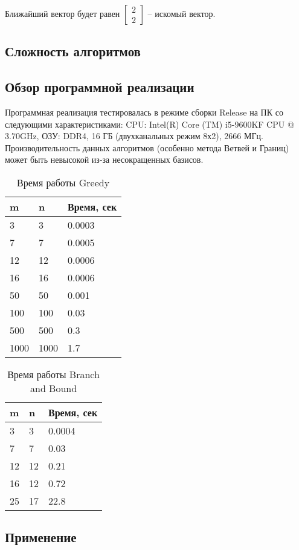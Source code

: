 Ближайший вектор будет равен $ \left[\begin{array}{cccc}
2 \\
2
\end{array}\right] $ -- искомый вектор.


\subsection{Сложность алгоритмов}

\subsection{Обзор программной реализации}

Программная реализация тестировалась в режиме сборки Release на ПК со следующими характеристиками: CPU: Intel(R) Core (TM) i5-9600KF CPU @ 3.70GHz, ОЗУ: DDR4, 16 ГБ (двухканальных режим 8х2), 2666 МГц. Производительность данных алгоритмов (особенно метода Ветвей и Границ) может быть невысокой из-за несокращенных базисов.

\begin{table}[h]
  \caption{Время работы Greedy}
  \centering
  \begin{tabular}{ | l | l | l |}
  \hline
  m & n & Время, сек   \\ \hline
  3 & 3 & 0.0003 \\ \hline
  7 & 7 & 0.0005 \\ \hline
  12 & 12 & 0.0006 \\ \hline
  16 & 16 & 0.0006 \\ \hline
  50 & 50 & 0.001 \\ \hline
  100 & 100 & 0.03 \\ \hline
  500 & 500 & 0.3 \\ \hline
  1000 & 1000 & 1.7 \\ \hline
  \end{tabular}
  \label{table:Greedy}
\end{table}

\begin{table}[h]
  \caption{Время работы Branch and Bound}
  \centering
  \begin{tabular}{ | l | l | l |}
  \hline
  m & n & Время, сек   \\ \hline
  3 & 3 & 0.0004 \\ \hline
  7 & 7 & 0.03 \\ \hline
  12 & 12 & 0.21 \\ \hline
  16 & 12 & 0.72 \\ \hline
  25 & 17 & 22.8 \\ \hline
  \end{tabular}
  \label{table:Branch and Bound}
\end{table}

\subsection{Применение}

\clearpage